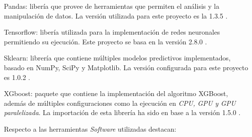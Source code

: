             \begin{description}

                \item Pandas: libería que provee de herramientas que permiten el análisis y la manipulación de datos. La versión utilizada para este proyecto es la 1.3.5 \cite{Pandas}.

                \item Tensorflow: libería utilizada para la implementación de redes neuronales permitiendo su ejecución. Este proyecto se basa en la versión 2.8.0 \cite{Tensorflow}.

                \item Sklearn: librería que contiene múltiples modelos predictivos implementados, basado en NumPy, SciPy y Matplotlib. La versión configurada para este proyecto es 1.0.2 \cite{Scikit-Learn}.

                \item XGboost: paquete que contiene la implementación del algoritmo XGBoost, además de múltiples configuraciones como la ejecución en \textit{CPU, GPU y GPU paralelizada}. La importación de esta librería ha sido en base a la versión 1.5.0 \cite{XGBoostLibrary}.

            \end{description}

            Respecto a las herramientas \textit{Software} utilizadas destacan:

